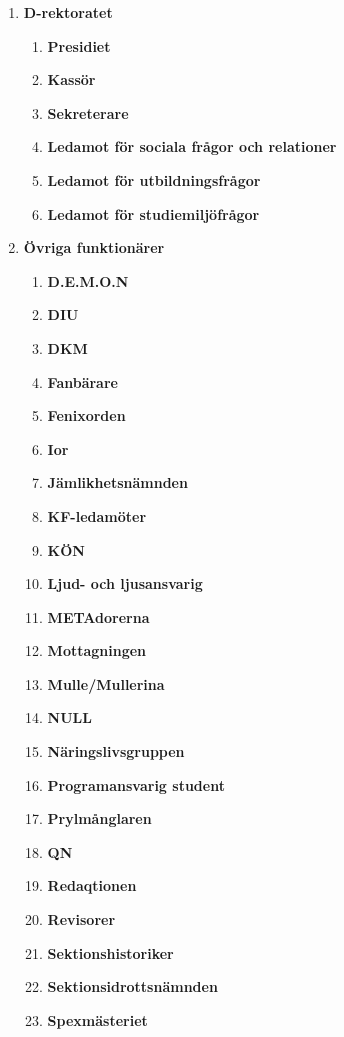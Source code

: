 \documentclass{protokoll}
\begin{document}
  \begin{enumerate}
    \item \textbf{D-rektoratet}
      \begin{enumerate}
        \item \textbf{Presidiet}
        \item \textbf{Kassör}
        \item \textbf{Sekreterare}
        \item \textbf{Ledamot för sociala frågor och relationer}
        \item \textbf{Ledamot för utbildningsfrågor}
        \item \textbf{Ledamot för studiemiljöfrågor}
      \end{enumerate}
    \item \textbf{Övriga funktionärer}
      \begin{enumerate}
        \item \textbf{D.E.M.O.N}
        \item \textbf{DIU}
        \item \textbf{DKM}
        \item \textbf{Fanbärare}
        \item \textbf{Fenixorden}
        \item \textbf{Ior}
        \item \textbf{Jämlikhetsnämnden}
        \item \textbf{KF-ledamöter}
        \item \textbf{KÖN}
  			\item \textbf{Ljud- och ljusansvarig}
        \item \textbf{METAdorerna}
        \item \textbf{Mottagningen}
  			\item \textbf{Mulle/Mullerina}
        \item \textbf{NULL}
        \item \textbf{Näringslivsgruppen}
        \item \textbf{Programansvarig student}
        \item \textbf{Prylmånglaren}
        \item \textbf{QN}
        \item \textbf{Redaqtionen} 
        \item \textbf{Revisorer}
        \item \textbf{Sektionshistoriker}
        \item \textbf{Sektionsidrottsnämnden}
        \item \textbf{Spexmästeriet}

\end{enumerate}
\end{enumerate}
\end{document}

